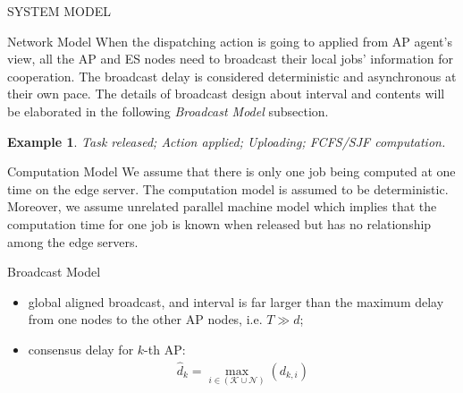 \documentclass[10pt, conference, letterpaper]{IEEEtran}
\newtheorem{example}{Example}
\begin{document}
\begin{section}{SYSTEM MODEL}
\begin{subsection}{Network Model}
            When the dispatching action is going to applied from AP agent's view, all the AP and ES nodes need to broadcast their local jobs' information for cooperation. The broadcast delay is considered deterministic and asynchronous at their own pace.
            The details of broadcast design about interval and contents will be elaborated in the following \textit{Broadcast Model} subsection.

            \begin{example}
                Task released; Action applied; Uploading; FCFS/SJF computation.
            \end{example}
        \end{subsection}

        \begin{subsection}{Computation Model}
            We assume that there is only one job being computed at one time on the edge server. The computation model is assumed to be deterministic.
            Moreover, we assume unrelated parallel machine model which implies that the computation time for one job is known when released but has no relationship among the edge servers.
        \end{subsection}

        \begin{subsection}{Broadcast Model}
            \begin{itemize}
                \item global aligned broadcast, and interval is far larger than the maximum delay from one nodes to the other AP nodes, i.e. $T \gg d$;
                \item consensus delay for $k$-th AP:
                    \begin{align}
                        \hat{d}_k = \max_{i\in(\mathcal{K} \cup \mathcal{N})}(d_{k,i})
                    \end{align}
            \end{itemize}


\end{subsection}
\end{section}
\end{document}
